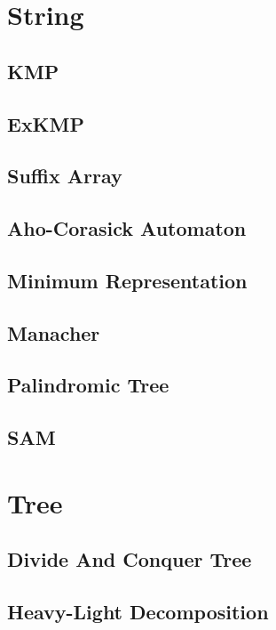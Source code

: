 \documentclass[twocolumn]{article}
\begin{document}
\section{String}
\subsection{KMP}

\subsection{ExKMP}

\subsection{Suffix Array}

\subsection{Aho-Corasick Automaton}

\subsection{Minimum Representation}

\subsection{Manacher}

\subsection{Palindromic Tree}

\subsection{SAM}

\section{Tree}
\subsection{Divide And Conquer Tree}

\subsection{Heavy-Light Decomposition}

\end{document}

